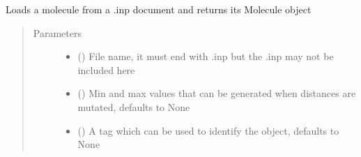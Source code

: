 \documentclass[letterpaper,10pt,english]{sphinxmanual}
\begin{document}
\begin{fulllineitems}
\begin{fulllineitems}
\label{\detokenize{molecular:molecular.Molecule.load}}
\sphinxAtStartPar
Loads a molecule from a .inp document and returns its Molecule object
\begin{quote}\begin{description}
\item[{Parameters}] \leavevmode\begin{itemize}
\item {} 
\sphinxAtStartPar
{} () \textendash{} File name, it must end with .inp but the .inp may not be included here

\item {} 
\sphinxAtStartPar
{} (\sphinxstyleliteralemphasis{\sphinxupquote{{[}}}\sphinxstyleliteralemphasis{\sphinxupquote{, }}\sphinxstyleliteralemphasis{\sphinxupquote{{]}}}\sphinxstyleliteralemphasis{\sphinxupquote{, }}) \textendash{} Min and max values that can be generated when distances are mutated, defaults to None

\item {} 
\sphinxAtStartPar
{} (\sphinxstyleliteralemphasis{\sphinxupquote{, }}) \textendash{} A tag which can be used to identify the object, defaults to None


\end{itemize}
\end{description}
\end{quote}
\end{fulllineitems}
\end{fulllineitems}
\end{document}

